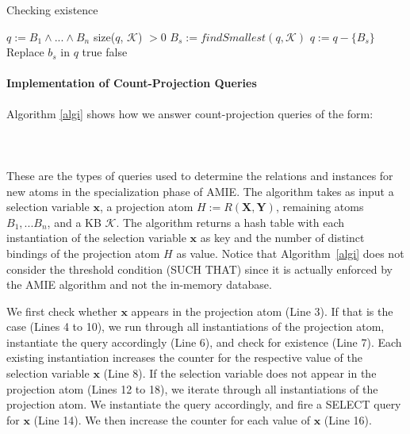 \begin{algorithm}
\caption{Checking existence}
\label{exists}
\begin{algorithmic}[1]
    \State $q := B_1 \wedge ... \wedge B_n$
      \State \Return size($q$, $\mathcal{K}$) $> 0$
    \Else
      \State $B_s := findSmallest(q, \mathcal{K})$
      \State $q := q - \{ B_s \} $
	\State Replace $b_s$ in $q$
	    \State \Return true
	  \EndIf
      \EndFor
    \EndIf
    \State \Return false
\EndFunction
\end{algorithmic}
\end{algorithm}

\paragraph{Implementation of Count-Projection Queries} Algorithm \ref{algi} shows how we answer count-projection queries
of the form: \\ \\
 \\ \\
These are the types of queries used to determine the relations and instances for new atoms in the specialization
phase of AMIE. The algorithm takes as input a selection variable $\bm{x}$, a projection atom $H:=R(\bm{X},\bm{Y})$, remaining atoms $B_1, ... B_n$, 
and a KB $\mathcal{K}$. 
The algorithm returns a hash table with each instantiation of the selection variable 
$\bm{x}$ as key and the number of distinct bindings of the projection atom $H$ as value. Notice that Algorithm~\ref{algi}
does not consider the threshold condition (SUCH THAT) since it is actually enforced by the AMIE algorithm and not 
the in-memory database. 

We first check whether $\bm{x}$ appears in the projection atom (Line 3).
If that is the case (Lines 4 to 10), we run through all instantiations of the projection atom, instantiate the query accordingly (Line 6), and check for existence (Line 7).
Each existing instantiation increases the counter for the respective value of the selection variable $\bm{x}$ (Line 8). 
If the selection variable does not appear in the projection atom (Lines 12 to 18), 
we iterate through all instantiations of the projection atom.
We instantiate the query accordingly, and fire a SELECT query for $\bm{x}$ (Line 14). 
We then increase the counter for each value of $\bm{x}$ (Line 16).


